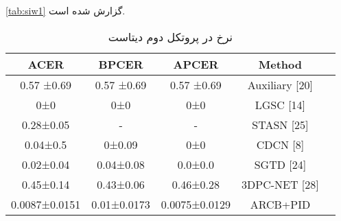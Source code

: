 \ref{tab:siw1}
گزارش شده است.
\begin{table}[ht]
	\caption{نرخ در پروتکل دوم دیتاست }
	\label{tab:siw2}
	\centering
	\onehalfspacing
	\begin{tabular}{|c|c|c|c|c|}
		\hline ACER          & BPCER       & APCER         & Method                &  \\
		\hline 0.57 ±0.69    & 0.57 ±0.69  & 0.57 ±0.69    & Auxiliary {[}20{]}    &  \\
		\hline 0±0           & 0±0         & 0±0           & LGSC {[}14{]}         &  \\
		\hline 0.28±0.05     & -           & -             & STASN {[}25{]}        &  \\
		\hline 0.04±0.5      & 0±0.09      & 0±0           & CDCN {[}8{]}          &  \\
		\hline 0.02±0.04     & 0.04±0.08   & 0.0±0.0       & SGTD 				{[}24{]}     &  \\
		\hline 0.45±0.14     & 0.43±0.06   & 0.46±0.28     & 3DPC-NET 				{[}28{]} &  \\
		0.0087±0.0151 & 0.01±0.0173 & 0.0075±0.0129 & ARCB+PID              &  \\
		\hline         
	\end{tabular}
\end{table}

